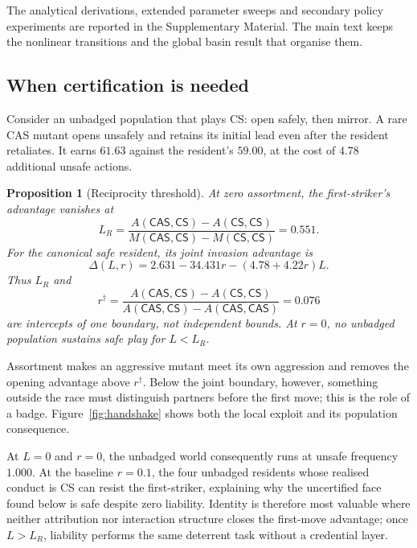 \documentclass[a4paper,fleqn,longmktitle]{cas-sc}
\theoremstyle{plain}
\newtheorem{proposition}[theorem]{Proposition}
\theoremstyle{definition}
\newcommand{\CS}{\textsf{CS}}
\newcommand{\CAS}{\textsf{CAS}}
\begin{document}
The analytical derivations, extended parameter sweeps and secondary policy
experiments are reported in the Supplementary Material. The main text keeps
the nonlinear transitions and the global basin result that organise them.

\subsection{When certification is needed}
\label{sec:reciprocity}

Consider an unbadged population that plays \CS{}: open safely, then mirror. A
rare \CAS{} mutant opens unsafely and retains its initial lead even after the
resident retaliates. It earns $61.63$ against the resident's $59.00$, at the
cost of $4.78$ additional unsafe actions.

\begin{proposition}[Reciprocity threshold]
\label{prop:reciprocity}
At zero assortment, the first-striker's advantage vanishes at
\begin{equation}
\label{eq:LR}
L_R=\frac{A(\CAS,\CS)-A(\CS,\CS)}
          {M(\CAS,\CS)-M(\CS,\CS)}=0.551.
\end{equation}
For the canonical safe resident, its joint invasion advantage is
\begin{equation}
\label{eq:jointfirststrike}
\Delta(L,r)=2.631-34.431r-(4.78+4.22r)L.
\end{equation}
Thus $L_R$ and
\begin{equation}
\label{eq:rdagger}
r^{\dagger}=\frac{A(\CAS,\CS)-A(\CS,\CS)}
 {A(\CAS,\CS)-A(\CAS,\CAS)}=0.076
\end{equation}
are intercepts of one boundary, not independent bounds. At $r=0$, no
unbadged population sustains safe play for $L<L_R$.
\end{proposition}

Assortment makes an aggressive mutant meet its own aggression and removes the
opening advantage above $r^{\dagger}$. Below the joint boundary, however,
something outside the race must distinguish partners before the first move;
this is the role of a badge. Figure~\ref{fig:handshake} shows both the local
exploit and its population consequence.

At $L=0$ and $r=0$, the unbadged world consequently runs at unsafe frequency
$1.000$. At the baseline $r=0.1$, the four unbadged residents whose realised
conduct is \CS{} can resist the first-striker, explaining why the uncertified
face found below is safe despite zero liability. Identity is therefore most
valuable where neither attribution nor interaction structure closes the
first-move advantage; once $L>L_R$, liability performs the same deterrent task
without a credential layer.
\end{document}
